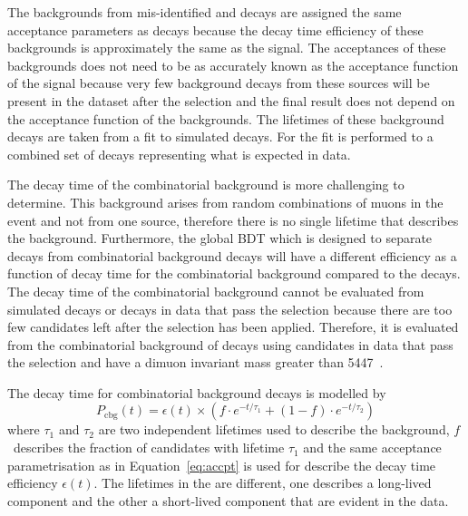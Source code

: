 {The backgrounds from mis-identified and \bdmumu decays are assigned the same acceptance parameters as \bsmumu decays because the decay time efficiency of these backgrounds is approximately the same as the signal. The acceptances of these backgrounds does not need to be as accurately known as the acceptance function of the signal because very few background decays from these sources will be present in the dataset after the selection and the final result does not depend on the acceptance function of the backgrounds. The lifetimes of these background decays are taken from a fit to simulated decays. For \bhh the fit is performed to a combined set of \bhh decays representing what is expected in data. %

The decay time \pdf of the combinatorial background is more challenging to determine. This background arises from random combinations of muons in the event and not from one source, therefore there is no single lifetime that describes the background. Furthermore, the global BDT which is designed to separate \bsmumu decays from combinatorial background decays will have a different efficiency as a function of decay time for the combinatorial background compared to the \bsmumu decays. The decay time \pdf of the combinatorial background cannot be evaluated from simulated decays or decays in data that pass the \bsmumu selection because there are too few candidates left after the selection has been applied. %
Therefore, it is evaluated from the combinatorial background of \bhh decays using candidates in data that pass the \bhh selection and have a dimuon invariant mass greater than 5447~\mevcc. %

The decay time \pdf for combinatorial background decays is modelled by
\begin{equation}
P_{\mathrm{cbg}}(t) = \epsilon(t)\times \left( f \cdot e^{-t/\tau_{1}} + (1-f)\cdot e^{-t/\tau_{2}} \right)
\label{eq:cbgDTpdf}
\end{equation}
where $\tau_{1}$ and $\tau_{2}$ are two independent lifetimes used to describe the background, $f$~describes the fraction of candidates with lifetime $\tau_{1}$ and the same acceptance parametrisation as in Equation~\ref{eq:accpt} is used for describe the decay time efficiency $\epsilon(t)$. The lifetimes in the \pdf are different, one describes a long-lived component and the other a short-lived component that are evident in the data. 

}

